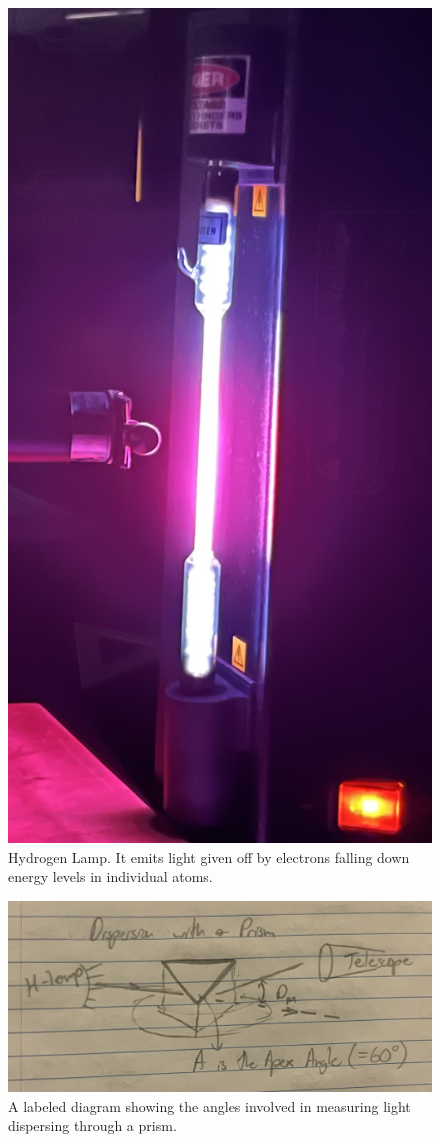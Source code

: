 \documentclass[letterpaper,11pt] {article}
\begin{document}
\begin{figure}[H] 
        \centering \includegraphics[width=0.7\columnwidth, height=10\headheight]{H-Spectrum Lab photos/H-lamp.jpg}
        \caption{\label{fig2}Hydrogen Lamp. It emits light given off by electrons falling down energy levels in individual atoms.
        }
\end{figure}


 \begin{figure}[H] 
        \centering \includegraphics[width=0.8\columnwidth]{H-Spectrum Lab photos/Prism Drawing.jpg}
        \caption{\label{fig3}A labeled diagram showing the angles involved in measuring light dispersing through a prism.
        }
\end{figure}
\end{document}
